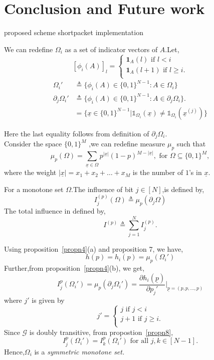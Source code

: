 \documentclass[
11pt, %
a4paper, %
oneside, %
headinclude,footinclude, %
BCOR5mm, %
]{scrartcl}
\begin{document}
\section{Conclusion and Future work}\label{future}
proposed scheme
shortpacket
implementation
\begin{definition}
We can redefine $\Omega_i$ as a set of indicator vectors of $A$.Let,
\[
    [\phi_i(A)]_l=\left\{
                \begin{array}{ll}
                  \mathbf{1}_A(l) \text{ if } l < i\\
                  \mathbf{1}_A(l+1) \text{ if } l \ge i.\\
                \end{array}
              \right.
  \]
\begin{align*}
\Omega_i' &\triangleq \{\phi_i(A) \in \{0,1\}^{N-1} : A \in \Omega_i\}\\
\partial_j\Omega_i' &\triangleq \{\phi_i(A) \in \{0,1\}^{N-1}: A \in \partial_j\Omega_i\}.\\& =\{\underline{x} \in \{0,1\}^{N-1} | \mathbb{1}_{\Omega_i}(\underline{x}) \neq  \mathbb{1}_{\Omega_i}(\underline{x}^{(j)})\}
\end{align*}
\label{defn13}
\end{definition}
Here the last equality follows from definition of $\partial_j\Omega_i$.\\
Consider the space $\{0,1\}^M$ ,we can redefine measure $\mu_p$ such that $$\mu_p(\Omega) = \sum_{\underline{x} \in \Omega} p^{|\underline{x}|}(1-p)^{M-|\underline{x}|}, \text{ for }\Omega \subseteq \{0,1\}^M,$$ where the weight $|\underline{x}| = x_1 + x_2 + \ldots + x_M$ is the number of $1$'s in $\underline{x}$. 
\begin{definition}
For a monotone set $\Omega$.The influence of bit $j \in [N]$,is defined by,
$$I_j^{(p)}(\Omega)\triangleq \mu_p(\partial_j\Omega)$$
The total influence in defined by,
$$I^{(p)}\triangleq \sum^N_{j=1}I_j^{(p)}.$$
\label{defn15}
\end{definition}
Using proposition~\ref{propn4}(a) and proposition 7, we have, 
$$h(p)=h_i(p)=\mu_p(\Omega_i')$$
Further,from proposition~\ref{propn4}(b), we get,
$$I_j^{p}(\Omega_i')=\mu_p(\partial_j\Omega_i') = \frac{\partial h_i(\underline{p})}{\partial p_j'}\Bigg|_{\underline{p}=(p,p,\ldots,p)}$$
where $j'$ is given by 
\[
    j'=\left\{
                \begin{array}{ll}
                  j \text{ if } j < i\\
                  j+1 \text{ if } j \ge i.\\
                \end{array}
              \right.
  \]
Since $\mathcal{G}$ is doubly transitive, from propostion~\ref{propn8}, $$I_j^{p}(\Omega_i') = I_k^{p}(\Omega_i') \text{ for all } j,k \in [N-1].$$
Hence,$\Omega_i$ is a \emph{symmetric monotone set.}
\end{document}

